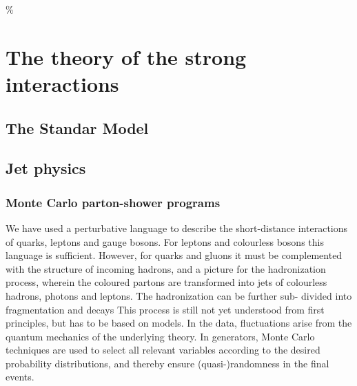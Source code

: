 \%
%
%
\chapter{The theory of the strong interactions}

\section{The Standar Model}\label{sec:qcdintro}



\section{Jet physics}\label{sec:jets}

\subsection{Monte Carlo parton-shower programs}

We have used a
perturbative language to describe the short-distance interactions of quarks, leptons and
gauge bosons.
For leptons and colourless bosons this language is sufficient. However, for
quarks and gluons it must be complemented with the structure of incoming hadrons, and a picture for the hadronization process, wherein the coloured partons are transformed into jets of colourless hadrons, photons and leptons.
The hadronization can be further sub-
divided into fragmentation and decays
This process is still not yet understood
from first principles, but has to be based on models.
In
the data, fluctuations arise from the quantum mechanics of the underlying theory. In
generators, Monte Carlo techniques are used to select all relevant variables according to the
desired probability distributions, and thereby ensure (quasi-)randomness in the final events.

